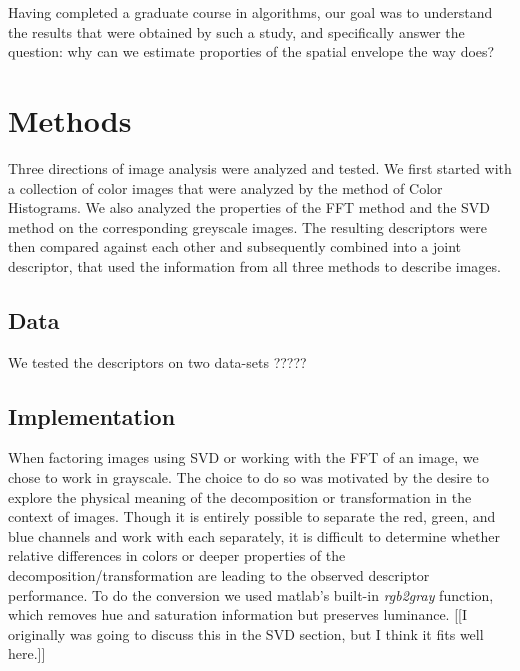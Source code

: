 \documentclass{report}
\begin{document}
Having completed a graduate course in algorithms, our goal was to understand the results that were obtained by such a study, and specifically answer the question: why can we estimate proporties of the spatial envelope the way \cite{gist_descriptor} does? 


\chapter{Methods}
Three directions of image analysis were analyzed and tested. We first started with a collection of color images that were analyzed by the method of Color Histograms. We also analyzed the properties of the FFT method and the SVD method on the corresponding greyscale images. The resulting descriptors were then compared against each other and subsequently combined into a joint descriptor, that used the information from all three methods to describe images.

\section{Data}
We tested the descriptors on two data-sets ?????
\section{Implementation}

When factoring images using SVD or working with the FFT of an image, we chose to work in grayscale. The choice to do so was motivated by the desire to explore the physical meaning of the decomposition or transformation in the context of images. Though it is entirely possible to separate the red, green, and blue channels and work with each separately, it is difficult to determine whether relative differences in colors or deeper properties of the decomposition/transformation are leading to the observed descriptor performance. To do the conversion we used matlab's built-in \textit{rgb2gray} function, which removes hue and saturation information but preserves luminance. [[I originally was going to discuss this in the SVD section, but I think it fits well here.]]
\end{document}
